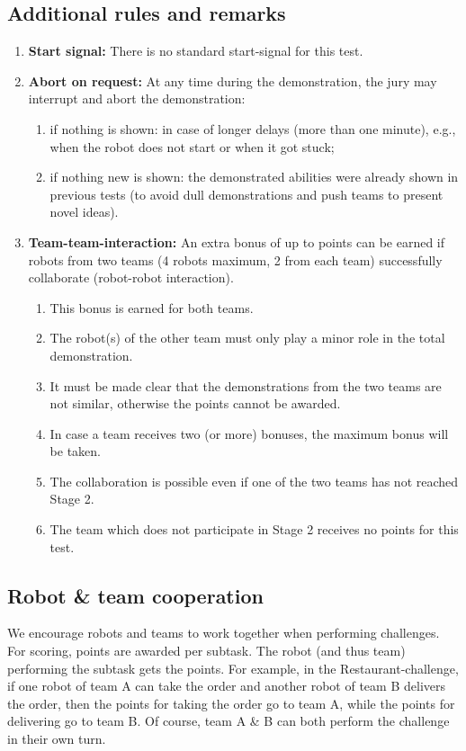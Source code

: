 \subsection{Additional rules and remarks}
\begin{enumerate}
	\item \textbf{Start signal:} There is no standard start-signal for this test.
	\item \textbf{Abort on request:} At any time during the demonstration, the jury may interrupt and abort the demonstration:
	\begin{enumerate}
		\item if nothing is shown: in case of longer delays (more than one minute), e.g., when the robot does not start or when it got stuck;
		\item if nothing new is shown: the demonstrated abilities were already shown in previous tests (to avoid dull demonstrations and push teams to present novel ideas).
	\end{enumerate}

	\item \textbf{Team-team-interaction:}  An extra bonus of up to \bonusRobotCoop points can be earned if robots from two teams (4 robots maximum, 2 from each team) successfully collaborate (robot-robot interaction).
	\begin{enumerate}
		\item This bonus is earned for both teams.
		\item The robot(s) of the other team must only play a minor role in the total demonstration.
		\item It must be made clear that the demonstrations from the two teams are not similar, otherwise the points cannot be awarded.
		\item In case a team receives two (or more) bonuses, the maximum bonus will be taken.
		\item The collaboration is possible even if one of the two teams has not reached Stage 2.
		\item The team which does not participate in Stage 2 receives no points for this test.
	\end{enumerate}
\end{enumerate}

\subsection{Robot \& team cooperation}
We encourage robots and teams to work together when performing challenges.
For scoring, points are awarded per subtask. The robot (and thus team) performing the subtask gets the points.
For example, in the Restaurant-challenge, if one robot of team A can take the order and another robot of team B delivers the order, then the points for taking the order go to team A, while the points for delivering go to team B. 
Of course, team A \& B can both perform the challenge in their own turn.


